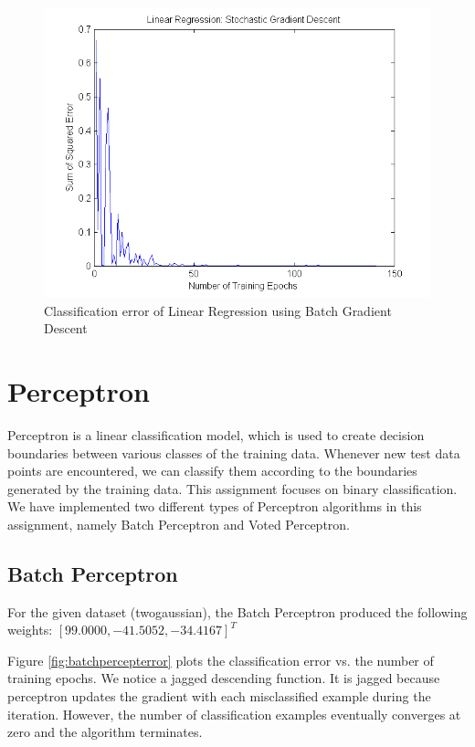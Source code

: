 \documentclass[12pt]{article}
\begin{document}
\begin{figure}[!t]
  \centering
  \includegraphics[scale=.70]{img/stochastic_regression_errors.png}
  \caption{Classification error of Linear Regression using Batch Gradient Descent}
  \label{fig:stochregerror}
\end{figure}

\section{Perceptron}

Perceptron is a linear classification model, which is used to create decision boundaries between various classes of the training data. Whenever new test data points are encountered, we can classify them according to the boundaries generated by the training data. This assignment focuses on binary classification. We have implemented two different types of Perceptron algorithms in this assignment, namely Batch Perceptron and Voted Perceptron.

\subsection{Batch Perceptron}

For the given dataset (twogaussian), the Batch Perceptron produced the following weights: \([99.0000, -41.5052, -34.4167]^T\)

Figure \ref{fig:batchpercepterror} plots the classification error vs. the number of training epochs. We notice a jagged descending function. It is jagged because perceptron updates the gradient with each misclassified example during the iteration. However, the number of classification examples eventually converges at zero and the algorithm terminates.
\end{document}

